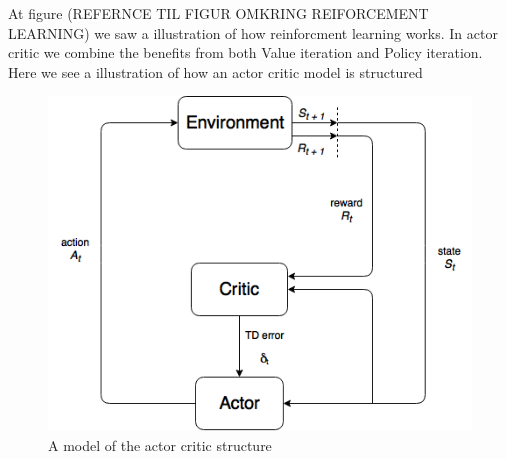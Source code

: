 \documentclass[11pt]{article}
\begin{document}
At figure (REFERNCE TIL FIGUR OMKRING REIFORCEMENT LEARNING) we saw a illustration of how reinforcment learning works. In actor critic we combine the benefits from both Value iteration and Policy iteration. Here we see a illustration of how an actor critic model is structured


\begin{figure}[H]
    \centering
    \includegraphics[scale=0.5]{include/ActorCriticDiagram.png}
    \caption{A model of the actor critic structure}
    \label{fig:actor_critic}
\end{figure}




%
%
\end{document}
